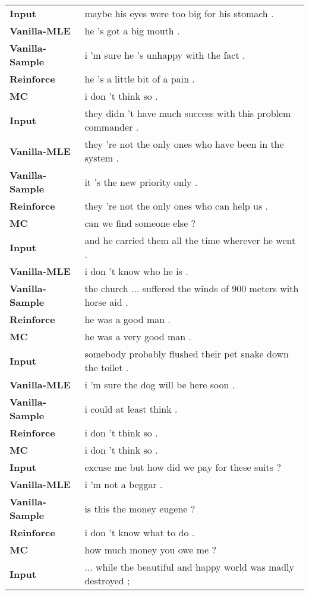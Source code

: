 \documentclass[11pt]{article}
\begin{document}
\begin{table*}[!htb]
\centering
\footnotesize
\begin{tabular}{p{4cm}p{8cm}}\hline
{\bf Input}&maybe his eyes were too big for his stomach .\\
{\bf Vanilla-MLE}&he 's got a big mouth .\\
{\bf Vanilla-Sample}&i 'm sure he 's unhappy with the fact .\\
{\bf Reinforce}&he 's a little bit of a pain .\\
{\bf MC}&i don 't think so .\\\hline
{\bf Input}&they didn 't have much success with this problem commander .\\
{\bf Vanilla-MLE}&they 're not the only ones who have been in the system .\\
{\bf Vanilla-Sample}&it 's the new priority only .\\
{\bf Reinforce}&they 're not the only ones who can help us .\\
{\bf MC}&can we find someone else ?\\\hline
{\bf Input}&and he carried them all the time wherever he went .\\
{\bf Vanilla-MLE}&i don 't know who he is .\\
{\bf Vanilla-Sample}&the church ... suffered the winds of 900 meters with horse aid .\\
{\bf Reinforce}&he was a good man .\\
{\bf MC}&he was a very good man .\\\hline
{\bf Input}&somebody probably flushed their pet snake down the toilet .\\
{\bf Vanilla-MLE}&i 'm sure the dog will be here soon .\\
{\bf Vanilla-Sample}&i could at least think .\\
{\bf Reinforce}&i don 't think so .\\
{\bf MC}&i don 't think so .\\\hline
{\bf Input}&excuse me but how did we pay for these suits ?\\
{\bf Vanilla-MLE}&i 'm not a beggar .\\
{\bf Vanilla-Sample}&is this the money eugene ?\\
{\bf Reinforce}&i don 't know what to do .\\
{\bf MC}& how much money you owe me ?\\\hline
{\bf Input}&... while the beautiful and happy world was madly destroyed ;\\

\end{tabular}
\end{table*}
\end{document}
